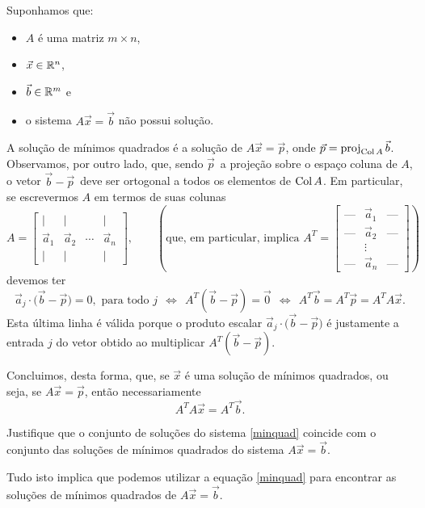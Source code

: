 \documentclass[../livro.tex]{subfiles}  %
\begin{document}
Suponhamos que:
\begin{itemize}
\item $A$ é uma matriz $m \times n$,
\item $\vec{x} \in \mathbb{R}^n$,
\item $\vec{b} \in \mathbb{R}^m$ e
\item o sistema $A \vec{x} = \vec{b}$ não possui solução.
\end{itemize} A solução de mínimos quadrados é a solução de $A \vec{x} = \vec{p}$, onde $\vec{p} = \operatorname{proj}_{\operatorname{Col} A} \vec{b}$. Observamos, por outro lado, que, sendo $\vec{p}\,$ a projeção sobre o espaço coluna de $A$, o vetor $\vec{b} - \vec{p}\,$ deve ser ortogonal a todos os elementos de $\operatorname{Col} A$. Em particular, se escrevermos $A$ em termos de suas colunas
\[
A =
\begin{bmatrix}
  | & | &   & | \\
  \vec{a}_1 & \vec{a}_2 & \cdots  & \vec{a}_n \\
  | & | &   & |
\end{bmatrix}, \qquad \left( \text{que,  em particular, implica }
  A^T = \begin{bmatrix}
    \text{---} & \vec{a}_1  & \text{---} \\
    \text{---} & \vec{a}_2  & \text{---} \\
    & \vdots     &  \\
    \text{---} & \vec{a}_n  & \text{---}
  \end{bmatrix}\right)
\] devemos ter
\[
\vec{a}_j \cdot \big(\vec{b} - \vec{p}\big) = 0, \text{ para todo } j  \ \  \iff \ \
A^T (\vec{b} - \vec{p}) = \vec{0} \ \ \iff \ \ A^T \vec{b} = A^T \vec{p} = A^T A\vec{x}.
\] Esta última linha é válida porque o produto escalar $\vec{a}_j \cdot \big(\vec{b} - \vec{p}\big)$ é justamente a entrada $j$ do vetor obtido ao multiplicar $A^T(\vec{b} - \vec{p})$.

Concluimos, desta forma, que, se $\vec{x}$ é uma solução de mínimos quadrados, ou seja, se $A \vec{x} = \vec{p}$, então necessariamente
\begin{equation}\label{minquad}
  \boxed{A^T A\vec{x} = A^T \vec{b}.}
\end{equation}

\begin{exercise}[Teórico]
  Justifique que o conjunto de soluções do sistema \eqref{minquad} coincide com o conjunto das soluções de mínimos quadrados do sistema $A \vec{x} = \vec{b}$.
\end{exercise}

Tudo isto implica que podemos utilizar a equação \eqref{minquad} para encontrar as soluções de mínimos quadrados de $A \vec{x} = \vec{b}$. 
\end{document}
